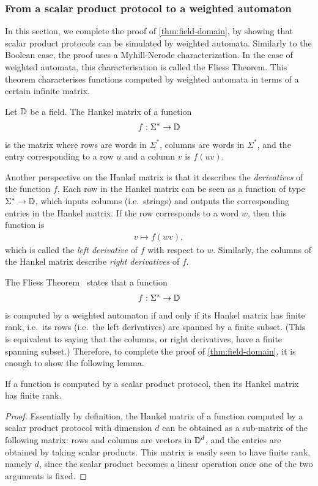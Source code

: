 \subsubsection{From a scalar product protocol to a weighted automaton}
\label{sec:from-scalar-product-protocol-to-weighted-automaton}
In this section, we complete the proof of \cref{thm:field-domain}, by showing that scalar product protocols can be simulated by weighted automata. Similarly to the Boolean case, the proof  uses a Myhill-Nerode characterization. In the case of weighted automata, this characterisation is called  the Fliess Theorem. This theorem  characterises functions computed by weighted automata in terms of a certain infinite matrix.

\begin{definition}\label{def:hankel-matrix}
    Let $\mathbb D$ be a field. The Hankel matrix of a function 
    \begin{align*}
    f : \Sigma^* \to \mathbb D
    \end{align*}  
    is the matrix where rows are words in $\Sigma^*$, columns are words in $\Sigma^*$, and the entry corresponding to a row $u$ and a column $v$ is $f(uv)$.
\end{definition}

Another perspective on the Hankel matrix is that it describes the \emph{derivatives} of the function $f$. Each row in the Hankel matrix can be seen as a function of type $\Sigma^* \to \mathbb D$, which inputs columns (i.e.~strings) and outputs the corresponding entries in the Hankel matrix. If the row corresponds to a word $w$, then this function is
\begin{align*}
v \mapsto f(wv),
\end{align*}
which is called the \emph{left derivative} of $f$ with respect to $w$. Similarly, the columns of the Hankel matrix describe \emph{right derivatives} of $f$.

The Fliess Theorem~\cite[Theorem 2.1.1]{fliess1974} states that a function 
\begin{align*}
f : \Sigma^* \to \mathbb D
\end{align*}
is computed by a weighted automaton if and only if  its  Hankel matrix  has finite rank, i.e.~its rows (i.e.~the left derivatives) are spanned by a finite subset. (This is equivalent to saying that the columns, or right derivatives, have a finite spanning subset.) Therefore, to complete the proof of \cref{thm:field-domain}, it is enough to show the following lemma.

\begin{lemma}\label{lem:hankel-finite-rank}
    If a function is computed by a scalar product protocol, then its Hankel matrix has finite rank.
\end{lemma}
\begin{proof}
    Essentially by definition, the Hankel matrix of a function computed by a scalar product protocol with dimension $d$ can be obtained as a sub-matrix of the following matrix: rows and columns are vectors in $\mathbb D^d$, and the entries are obtained by taking scalar products. This matrix is easily seen to have finite rank, namely $d$, since the scalar product  becomes a linear operation once one of the two arguments is fixed.
\end{proof}
